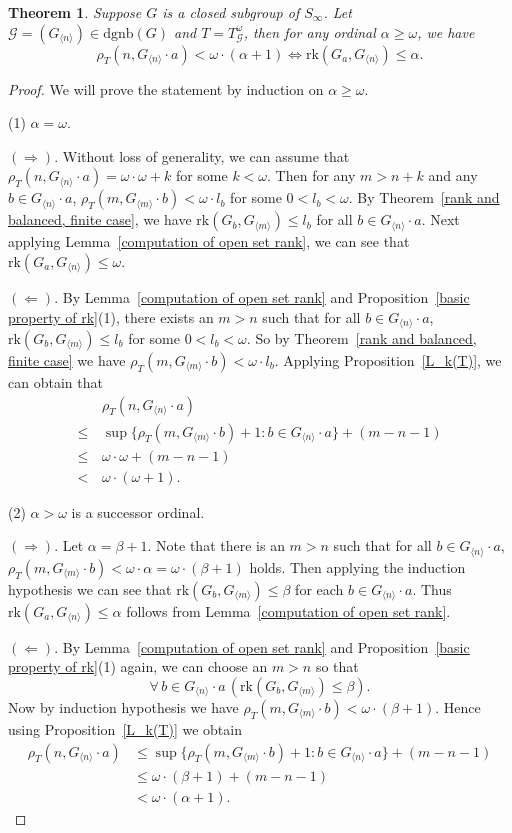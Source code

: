 \documentclass[11pt]{amsart}
\newtheorem{theorem}{Theorem}[section]
\theoremstyle{definition}
\theoremstyle{remark}
\numberwithin{equation}{section}
\def\dgnb{{\mathrm{dgnb}}}
\def\gnb#1{G_{\langle #1\rangle}}
\def\otr#1#2{T_{\mathcal{#1}}^{#2}}
\def\rk{\mathrm{rk}}
\begin{document}
\begin{theorem}\label{rank and balanced, infinite case}
    Suppose $G$ is a closed subgroup of $S_\infty$. Let $\mathcal{G}=(\gnb{n})\in\dgnb(G)$ and $T=\otr{G}{\omega}$, then for any ordinal $\alpha\geq\omega$, we have
    $$\rho_T(n,\gnb{n}\cdot a)<\omega\cdot(\alpha+1)\iff\rk(G_a,\gnb{n})\leq\alpha.$$
\end{theorem}
\begin{proof}
We will prove the statement by induction on $\alpha\geq\omega$.

(1) $\alpha=\omega$.

$(\Rightarrow)$. Without loss of generality, we can assume that $\rho_T(n,\gnb{n}\cdot a)=\omega\cdot\omega+k$ for some $k<\omega$. Then for any $m>n+k$ and any $b\in\gnb{n}\cdot a$, $\rho_T(m,\gnb{m}\cdot b)<\omega\cdot l_b$ for some $0<l_b<\omega$. By Theorem~\ref{rank and balanced, finite case}, we have $\rk(G_b,\gnb{m})\leq l_b$ for all $b\in\gnb{n}\cdot a$. Next applying Lemma~\ref{computation of open set rank}, we can see that $\rk(G_a,\gnb{n})\leq\omega$.

$(\Leftarrow)$. By Lemma~\ref{computation of open set rank} and Proposition~\ref{basic property of rk}(1), there exists an $m>n$ such that for all $b\in\gnb{n}\cdot a$, $\rk(G_b,\gnb{m})\leq l_b$ for some $0<l_b<\omega$. So by Theorem~\ref{rank and balanced, finite case} we have $\rho_T(m,\gnb{m}\cdot b)<\omega\cdot l_b$. Applying Proposition~\ref{L_k(T)}, we can obtain that
    \begin{align*}
        &\rho_T(n,\gnb{n}\cdot a)\\
        \leq\,&\sup\{\rho_T(m,\gnb{m}\cdot b)+1:b\in\gnb{n}\cdot a\}+(m-n-1)\\
        \leq\,&\omega\cdot\omega+(m-n-1)\\
        <\,&\omega\cdot(\omega+1).
    \end{align*}

    (2) $\alpha>\omega$ is a successor ordinal.

    $(\Rightarrow)$. Let $\alpha=\beta+1$. Note that there is an $m>n$ such that for all $b\in\gnb{n}\cdot a$, $\rho_T(m,\gnb{m}\cdot b)<\omega\cdot\alpha=\omega\cdot(\beta+1)$ holds. Then applying the induction hypothesis we can see that $\rk(G_b,\gnb{m})\leq\beta$ for each $b\in\gnb{n}\cdot a$. Thus $\rk(G_a,\gnb{n})\leq\alpha$ follows from Lemma~\ref{computation of open set rank}.

    $(\Leftarrow)$. By Lemma~\ref{computation of open set rank} and Proposition~\ref{basic property of rk}(1) again, we can choose an $m>n$ so that
    $$\forall\,b\in\gnb{n}\cdot a\,(\rk(G_b,\gnb{m})\leq\beta).$$
    Now by induction hypothesis we have $\rho_T(m,\gnb{m}\cdot b)<\omega\cdot(\beta+1)$. Hence using Proposition~\ref{L_k(T)} we obtain
    \begin{align*}
        \rho_T(n,\gnb{n}\cdot a)&\leq\sup\{\rho_T(m,\gnb{m}\cdot b)+1:b\in\gnb{n}\cdot a\}+(m-n-1)\\
        &\leq\omega\cdot(\beta+1)+(m-n-1)\\
        &<\omega\cdot(\alpha+1).
    \end{align*}


\end{proof}
\end{document}
